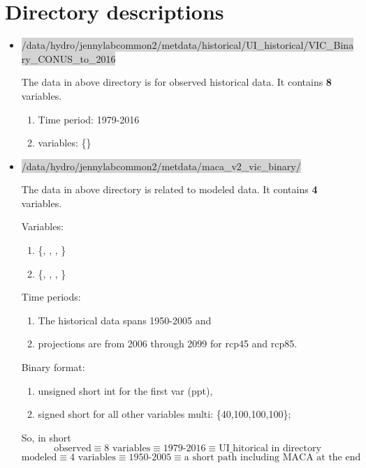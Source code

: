 \section{Directory descriptions}


\begin{itemize}

\item {\scriptsize{\colorbox{lightgray}{/data/hydro/jennylabcommon2/metdata/historical/UI\_historical/VIC\_Binary\_CONUS\_to\_2016}}}

The data in above directory is for observed historical data. It contains \textbf{8} variables.

\begin{enumerate}
\item Time period: 1979-2016
\item variables: \{\}
\end{enumerate}


\item {\scriptsize{\colorbox{lightgray}{/data/hydro/jennylabcommon2/metdata/maca\_v2\_vic\_binary/}}}


The data in above directory is related to modeled data. It contains \textbf{4} variables.

Variables: 
\begin{enumerate}

\item \{, , , \} 	
\item \{, , , \}	

\end{enumerate}

Time periods:
\begin{enumerate}	
\item The historical data spans 1950-2005 and 	
\item projections are from 2006 through 2099 for rcp45 and rcp85.
\end{enumerate}

Binary format:
\begin{enumerate}
\item unsigned short int for the first var (ppt),	
\item signed short for all other variables multi: \{40,100,100,100\};
\end{enumerate}



So, in short 
\[ \text{observed} \equiv  \text{8 variables} \equiv \text{1979-2016}
\equiv \text{UI\_hitorical in directory }\]
\vspace{-.2in}
\[ \text{modeled} \equiv  \text{4 variables} \equiv \text{1950-2005} \equiv \text{a short path including MACA at the end}\]

\end{itemize}




